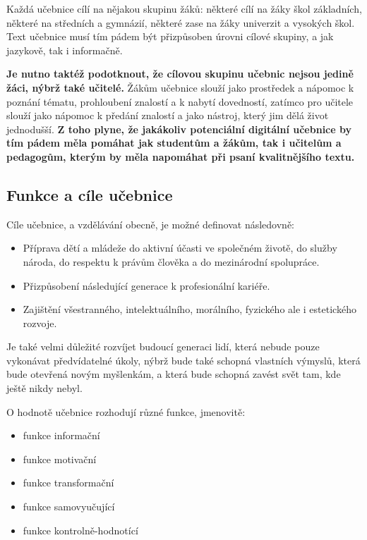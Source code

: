 \documentclass[12pt]{article}
\begin{document}
Každá učebnice cílí na nějakou skupinu žáků: některé cílí na žáky škol základních, některé na středních a gymnázií, některé zase na žáky univerzit a vysokých škol. Text učebnice musí tím pádem být přizpůsoben úrovni cílové skupiny, a jak jazykově, tak i informačně.
\cite[str. 13]{PAN2023}

\textbf{Je nutno taktéž podotknout, že cílovou skupinu učebnic nejsou jedině žáci, nýbrž také učitelé.} Žákům učebnice slouží jako prostředek a nápomoc k poznání tématu, prohloubení znalostí a k nabytí dovedností, zatímco pro učitele slouží jako nápomoc k předání znalostí a jako nástroj, který jim dělá život jednodušší.
\cite[str. 6-7]{PAN2023}
\textbf{Z toho plyne, že jakákoliv potenciální digitální učebnice by tím pádem měla pomáhat jak studentům a žákům, tak i učitelům a pedagogům, kterým by měla napomáhat při psaní kvalitnějšího textu.}

\subsection{Funkce  a cíle učebnice}

Cíle učebnice, a vzdělávání obecně, je možné definovat následovně:
\begin{itemize}
	\item{} Příprava dětí a mládeže do aktivní účasti ve společném životě, do služby národa, do respektu k právům člověka a do mezinárodní spolupráce.
	\item{} Přizpůsobení následující generace k profesionální kariéře.
	\item{} Zajištění všestranného, intelektuálního, morálního, fyzického ale i estetického rozvoje.
\end{itemize} \cite[str. 52-53]{PDO}

Je také velmi důležité rozvíjet budoucí generaci lidí, která nebude pouze vykonávat předvídatelné úkoly, nýbrž bude také schopná vlastních výmyslů, která bude otevřená novým myšlenkám, a která bude schopná zavést svět tam, kde ještě nikdy nebyl.  \cite[str. 52]{PDO}

O hodnotě učebnice rozhodují různé funkce, jmenovitě:

\begin{itemize}
	\item{} funkce informační
	\item{} funkce motivační
	\item{} funkce transformační
	\item{} funkce samovyučující
	\item{} funkce kontrolně-hodnotící
\end{itemize} \cite[str. 8]{PAN2023}
\end{document}
